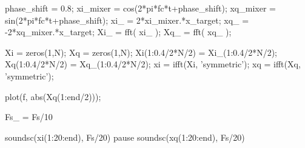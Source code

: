 \documentclass[10pt,twocolumn]{article}
\begin{document}
\begin{spverbatim}
%
%
phase_shift = 0.8;
xi_mixer = cos(2*pi*fc*t+phase_shift);
xq_mixer = sin(2*pi*fc*t+phase_shift);
xi_ = 2*xi_mixer.*x_target;
xq_ = -2*xq_mixer.*x_target;
Xi_ = fft( xi_ );
Xq_ = fft( xq_ );

Xi = zeros(1,N);
Xq = zeros(1,N);
Xi(1:0.4/2*N/2) = Xi_(1:0.4/2*N/2);
Xq(1:0.4/2*N/2) = Xq_(1:0.4/2*N/2);
xi = ifft(Xi, 'symmetric');
xq = ifft(Xq, 'symmetric');

plot(f, abs(Xq(1:end/2)));

Fs_ = Fs/10

soundsc(xi(1:20:end), Fs/20)
pause
soundsc(xq(1:20:end), Fs/20)  

\end{spverbatim}
\end{document}
